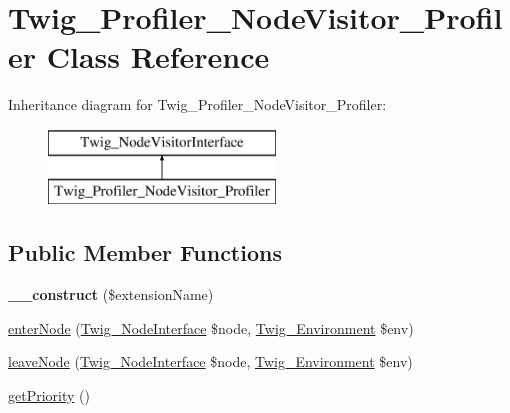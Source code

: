 \hypertarget{class_twig___profiler___node_visitor___profiler}{}\section{Twig\+\_\+\+Profiler\+\_\+\+Node\+Visitor\+\_\+\+Profiler Class Reference}
\label{class_twig___profiler___node_visitor___profiler}
Inheritance diagram for Twig\+\_\+\+Profiler\+\_\+\+Node\+Visitor\+\_\+\+Profiler\+:\begin{figure}[H]
\begin{center}
\leavevmode
\includegraphics[height=2.000000cm]{class_twig___profiler___node_visitor___profiler}
\end{center}
\end{figure}
\subsection*{Public Member Functions}
\begin{DoxyCompactItemize}
\item 
\hypertarget{class_twig___profiler___node_visitor___profiler_a152cb2555207b5397f22388c95600aec}{}{\bfseries \+\_\+\+\_\+construct} (\$extension\+Name)\label{class_twig___profiler___node_visitor___profiler_a152cb2555207b5397f22388c95600aec}

\item 
\hyperlink{class_twig___profiler___node_visitor___profiler_ad3bfee38f2bc56df9500da7f20b6e13a}{enter\+Node} (\hyperlink{interface_twig___node_interface}{Twig\+\_\+\+Node\+Interface} \$node, \hyperlink{class_twig___environment}{Twig\+\_\+\+Environment} \$env)
\item 
\hyperlink{class_twig___profiler___node_visitor___profiler_a436bb1ae16511148e860e5cfa2cad88f}{leave\+Node} (\hyperlink{interface_twig___node_interface}{Twig\+\_\+\+Node\+Interface} \$node, \hyperlink{class_twig___environment}{Twig\+\_\+\+Environment} \$env)
\item 
\hyperlink{class_twig___profiler___node_visitor___profiler_a1e7a3c168dcd0901a0d2669c67575b55}{get\+Priority} ()
\end{DoxyCompactItemize}



